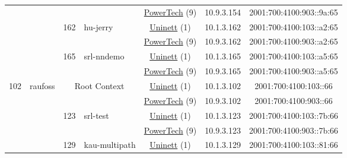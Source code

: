 \begin{small}
\begin{center}
\begin{longtable}{|c|c|c|c|c|c|c|c|}
  &  &  &  & \multicolumn{2}{|c|}{\tiny{\href{http://www.powertech.no}{PowerTech} (9)}} & \tiny{10.9.3.154} & \tiny{2001:700:4100:903::9a:65} \\* \cline{3-3}\cline{4-4}\cline{5-5}\cline{6-6}\cline{7-7}\cline{8-8}
  &  & \multirow{2}{*}{\tiny{162}} & \multicolumn{1}{|l|}{\multirow{2}{*}{\tiny{hu-jerry}}} & \multicolumn{2}{|c|}{\tiny{\href{https://www.uninett.no}{Uninett} (1)}} & \tiny{10.1.3.162} & \tiny{2001:700:4100:103::a2:65} \\* \cline{5-5}\cline{6-6}\cline{7-7}\cline{8-8}
  &  &  &  & \multicolumn{2}{|c|}{\tiny{\href{http://www.powertech.no}{PowerTech} (9)}} & \tiny{10.9.3.162} & \tiny{2001:700:4100:903::a2:65} \\* \cline{3-3}\cline{4-4}\cline{5-5}\cline{6-6}\cline{7-7}\cline{8-8}
  &  & \multirow{2}{*}{\tiny{165}} & \multicolumn{1}{|l|}{\multirow{2}{*}{\tiny{srl-nndemo}}} & \multicolumn{2}{|c|}{\tiny{\href{https://www.uninett.no}{Uninett} (1)}} & \tiny{10.1.3.165} & \tiny{2001:700:4100:103::a5:65} \\* \cline{5-5}\cline{6-6}\cline{7-7}\cline{8-8}
  &  &  &  & \multicolumn{2}{|c|}{\tiny{\href{http://www.powertech.no}{PowerTech} (9)}} & \tiny{10.9.3.165} & \tiny{2001:700:4100:903::a5:65} \\ \hline
 \multirow{18}{*}{\tiny{102}} & \multicolumn{1}{|l|}{\multirow{18}{*}{\tiny{raufoss}}} & \multicolumn{2}{|c|}{\multirow{2}{*}{\tiny{Root Context}}} & \multicolumn{2}{|c|}{\tiny{\href{https://www.uninett.no}{Uninett} (1)}} & \tiny{10.1.3.102} & \tiny{2001:700:4100:103::66} \\* \cline{5-5}\cline{6-6}\cline{7-7}\cline{8-8}
  &  & \multicolumn{2}{|c|}{} & \multicolumn{2}{|c|}{\tiny{\href{http://www.powertech.no}{PowerTech} (9)}} & \tiny{10.9.3.102} & \tiny{2001:700:4100:903::66} \\* \cline{3-3}\cline{4-4}\cline{5-5}\cline{6-6}\cline{7-7}\cline{8-8}
  &  & \multirow{2}{*}{\tiny{123}} & \multicolumn{1}{|l|}{\multirow{2}{*}{\tiny{srl-test}}} & \multicolumn{2}{|c|}{\tiny{\href{https://www.uninett.no}{Uninett} (1)}} & \tiny{10.1.3.123} & \tiny{2001:700:4100:103::7b:66} \\* \cline{5-5}\cline{6-6}\cline{7-7}\cline{8-8}
  &  &  &  & \multicolumn{2}{|c|}{\tiny{\href{http://www.powertech.no}{PowerTech} (9)}} & \tiny{10.9.3.123} & \tiny{2001:700:4100:903::7b:66} \\* \cline{3-3}\cline{4-4}\cline{5-5}\cline{6-6}\cline{7-7}\cline{8-8}
  &  & \multirow{2}{*}{\tiny{129}} & \multicolumn{1}{|l|}{\multirow{2}{*}{\tiny{kau-multipath}}} & \multicolumn{2}{|c|}{\tiny{\href{https://www.uninett.no}{Uninett} (1)}} & \tiny{10.1.3.129} & \tiny{2001:700:4100:103::81:66} \\* \cline{5-5}\cline{6-6}\cline{7-7}\cline{8-8}

\end{longtable}
\end{center}
\end{small}
